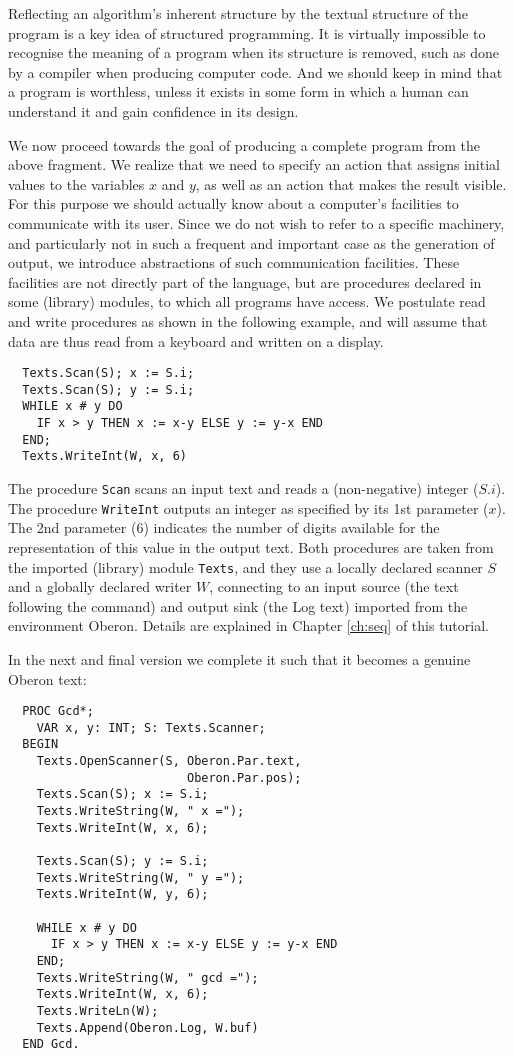 Reflecting an algorithm's inherent structure by the textual structure of the program is a key idea of
structured programming. It is virtually impossible to recognise the meaning of a program when its
structure is removed, such as done by a compiler when producing computer code. And we should keep in
mind that a program is worthless, unless it exists in some form in which a human can understand it
and gain confidence in its design.

We now proceed towards the goal of producing a complete program from the above fragment. We realize
that we need to specify an action that assigns initial values to the variables $x$ and $y$, as well
as an action that makes the result visible. For this purpose we should actually know about a
computer's facilities to communicate with its user. Since we do not wish to refer to a specific
machinery, and particularly not in such a frequent and important case as the generation of output,
we introduce abstractions of such communication facilities. These facilities are not directly part of
the language, but are procedures declared in some (library) modules, to which all programs have
access. We postulate read and write procedures as shown in the following example, and will assume
that data are thus read from a keyboard and written on a display.
\begin{verbatim}
  Texts.Scan(S); x := S.i;
  Texts.Scan(S); y := S.i;
  WHILE x # y DO
    IF x > y THEN x := x-y ELSE y := y-x END
  END;
  Texts.WriteInt(W, x, 6)
\end{verbatim}

The procedure \verb|Scan| scans an input text and reads a (non-negative) integer ($S.i$).
The procedure \verb|WriteInt| outputs an integer as specified by its 1st parameter ($x$).
The 2nd parameter (6) indicates the number of digits available for the representation of
this value in the output text. Both procedures are taken from the imported (library)
module \verb|Texts|, and they use a locally declared scanner $S$ and a globally declared
writer $W$, connecting to an input source (the text following the command) and output sink
(the Log text) imported from the environment Oberon. Details are explained in Chapter
\ref{ch:seq} of this tutorial.

In the next and final version we complete it such that it becomes a genuine Oberon text:
\begin{verbatim}
  PROC Gcd*;
    VAR x, y: INT; S: Texts.Scanner;
  BEGIN
    Texts.OpenScanner(S, Oberon.Par.text,
                         Oberon.Par.pos);
    Texts.Scan(S); x := S.i;
    Texts.WriteString(W, " x =");
    Texts.WriteInt(W, x, 6);

    Texts.Scan(S); y := S.i;
    Texts.WriteString(W, " y =");
    Texts.WriteInt(W, y, 6);

    WHILE x # y DO
      IF x > y THEN x := x-y ELSE y := y-x END
    END;
    Texts.WriteString(W, " gcd =");
    Texts.WriteInt(W, x, 6);
    Texts.WriteLn(W);
    Texts.Append(Oberon.Log, W.buf)
  END Gcd.
\end{verbatim}

